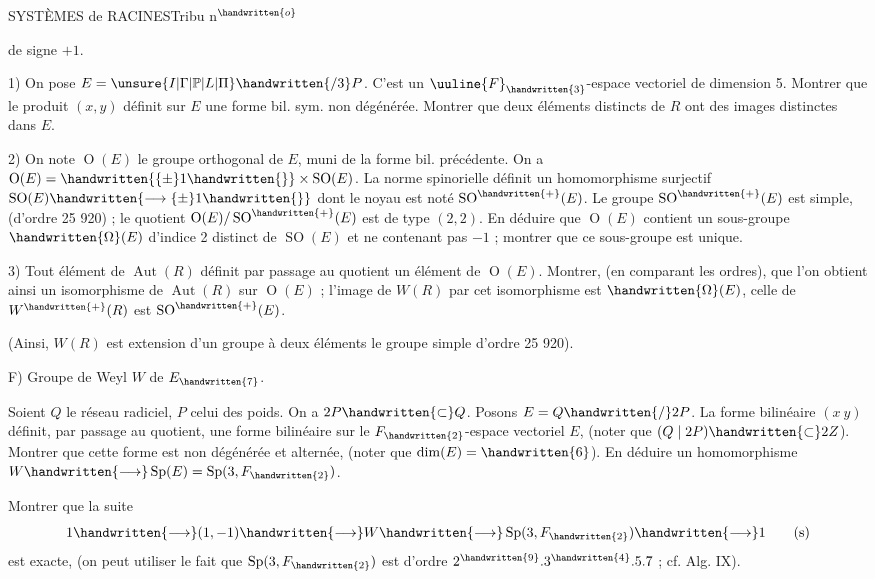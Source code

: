 SYSTÈMES de RACINES\hfill Tribu n$^{\handwritten{o}}$ 

de signe $+1$.

1) On pose $E=\unsure{I|\Gamma|\mathbb{P}|L|\Pi}\handwritten{/3}P$. C'est un $\uuline{F}_{\handwritten{3}}$-espace vectoriel de dimension 5. Montrer que le produit $(x,y)$ définit sur $E$ une forme bil. sym. non dégénérée. Montrer que deux éléments distincts de $R$ ont des images distinctes dans $E$.

2) On note $\operatorname{O}(E)$ le groupe orthogonal de $E$, muni de la forme bil. précédente. On a $\operatorname{O}(E)=\handwritten{\{\pm}1\handwritten{\}}\times\operatorname{SO}(E)$. La norme spinorielle définit un homomorphisme surjectif $\operatorname{SO}(E)\handwritten{\longrightarrow\{\pm}1\handwritten{\}}$ dont le noyau est noté $\operatorname{SO}^{\handwritten{+}}(E)$. Le groupe $\operatorname{SO}^{\handwritten{+}}(E)$ est simple, (d'ordre 25 920) ; le quotient $\operatorname{O}(E)/\operatorname{SO}^{\handwritten{+}}(E)$ est de type $(2,2)$. En déduire que $\operatorname{O}(E)$ contient un sous-groupe $\handwritten{\Omega}(E)$ d'indice 2 distinct de $\operatorname{SO}(E)$ et ne contenant pas $-1$ ; montrer que ce sous-groupe est unique.

3) Tout élément de $\operatorname{Aut}(R)$ définit par passage au quotient un élément de $\operatorname{O}(E)$. Montrer, (en comparant les ordres), que l'on obtient ainsi un isomorphisme de $\operatorname{Aut}(R)$ sur $\operatorname{O}(E)$ ; l'image de $W(R)$ par cet isomorphisme est $\handwritten{\Omega}(E)$, celle de $W^{\handwritten{+}}(R)$ est $\operatorname{SO}^{\handwritten{+}}(E)$.

(Ainsi, $W(R)$ est extension d'un groupe à deux éléments  le groupe simple d'ordre 25 920).

F) Groupe de Weyl $W$ de $E_{\handwritten{7}}$.

Soient $Q$ le réseau radiciel, $P$ celui des poids. On a $2P\handwritten{\subset}Q$. Posons $E=Q\handwritten{/}2P$. La forme bilinéaire $(x\ y)$ définit, par passage au quotient, une forme bilinéaire sur le $F_{\handwritten{2}}$-espace vectoriel $E$, (noter que $(Q\mid 2P)\handwritten{\subset}2Z$). Montrer que cette forme est non dégénérée et alternée, (noter que $\dim(E)=\handwritten{6}$). En déduire un homomorphisme $W\handwritten{\longrightarrow}\operatorname{Sp}(E)=\operatorname{Sp}(3,F_{\handwritten{2}})$.

Montrer que la suite
\[
1\handwritten{\longrightarrow}(1,-1)\handwritten{\longrightarrow}W\handwritten{\longrightarrow}\operatorname{Sp}(3,F_{\handwritten{2}})\handwritten{\longrightarrow}1
\tag*{(s)}
\]
est exacte, (on peut utiliser le fait que $\operatorname{Sp}(3,F_{\handwritten{2}})$ est d'ordre $2^{\handwritten{9}}.3^{\handwritten{4}}.5.7$ ; cf. Alg. IX).


